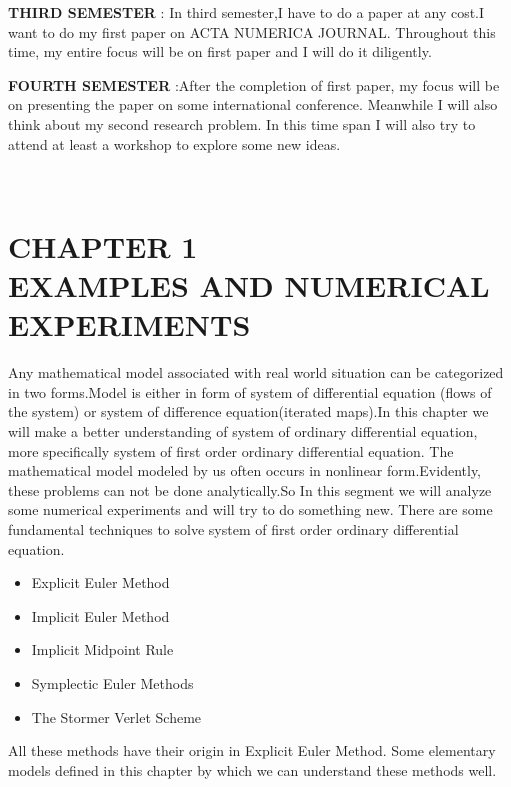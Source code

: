 \documentclass[PhD]{iitmdiss} %
\begin{document}
{{\begin{itemize}
{\end{itemize}
\textbf{THIRD SEMESTER} : In third semester,I have to do a paper at any cost.I want to do my first paper on
ACTA NUMERICA JOURNAL. Throughout this time, my entire focus will be on first paper
and I will do it diligently.\\
\par
\textbf{FOURTH SEMESTER} :After the completion of first paper, my focus will be on presenting the paper on some international conference. Meanwhile I will also think about my second research problem. In this time span I will also try to attend at least a workshop to explore some new ideas.}\\

\chapter{CHAPTER 1\\ EXAMPLES AND NUMERICAL EXPERIMENTS}
Any mathematical model associated with real world situation can be categorized in two forms.Model is either in form of system of differential equation (flows of the system) or system of difference equation(iterated maps).In this chapter we will make a better understanding of system of ordinary differential equation, more specifically system of first order ordinary differential equation. The mathematical model modeled by us often occurs in nonlinear form.Evidently, these problems can not be done analytically.So In this segment we will analyze some numerical experiments and will try to do something new.
There are some fundamental techniques to solve system of first order ordinary differential equation.\\
\begin{itemize}
    \item {Explicit Euler Method}\\
    \item {Implicit Euler Method}\\
    \item {Implicit Midpoint Rule}\\
    \item {Symplectic Euler Methods}\\
    \item {The Stormer Verlet Scheme}\\
\end{itemize}
All these methods have their origin in Explicit Euler Method. Some elementary models  defined in this chapter by which we can understand these methods well.
}
\end{document}
